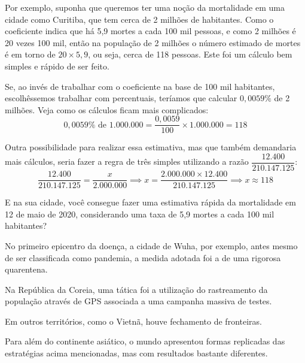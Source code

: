 Por exemplo, suponha que queremos ter uma noção da mortalidade em uma cidade como Curitiba, que tem cerca de 2 milhões de habitantes. Como o coeficiente indica que há 5,9 mortes a cada 100 mil pessoas, e como 2 milhões é 20 vezes 100 mil, então na população de 2 milhões o número estimado de mortes é em torno de $20\times5{,}9$, ou seja, cerca de 118 pessoas. Este foi um cálculo bem simples e rápido de ser feito.

Se, ao invés de trabalhar com o coeficiente na base de 100 mil habitantes, escolhêssemos trabalhar com percentuais, teríamos que calcular $0{,}0059\%$ de 2 milhões. Veja como os cálculos ficam mais complicados:
\begin{equation*}
0{,}0059\%\text{ de }1.000.000=\frac{0{,}0059}{100}\times 1.000.000=118
\end{equation*}

Outra possibilidade para realizar essa estimativa, mas que também demandaria mais cálculos, seria fazer a regra de três simples utilizando a razão $\dfrac{12.400}{210.147.125}$:
\begin{equation*}
\frac{12.400}{210.147.125}=\frac{x}{2.000.000}\implies x=\frac{2.000.000\times 12.400}{210.147.125}\implies x\approx 118
\end{equation*}

E na sua cidade, você consegue fazer uma estimativa rápida da mortalidade em 12 de maio de 2020, considerando uma taxa de 5,9 mortes a cada 100 mil habitantes?


No primeiro epicentro da doença, a cidade de Wuha, por exemplo, antes mesmo de ser classificada como pandemia, a medida adotada foi a de uma rigorosa quarentena.

Na República da Coreia, uma tática foi a utilização do rastreamento da população através de GPS associada a uma campanha massiva de testes.

Em outros territórios, como o Vietnã, houve fechamento de fronteiras.

Para além do continente asiático, o mundo apresentou formas replicadas das estratégias acima mencionadas, mas com resultados bastante diferentes.

